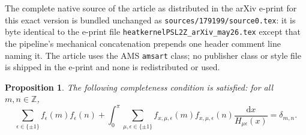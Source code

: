 \documentclass[10pt,a4paper]{amsart}
\newtheorem{proposition}{Proposition}
\newcommand{\Z}{\mathbb{Z}}
\begin{document}
The complete native source of the article as distributed in the arXiv e-print for this exact version is bundled unchanged as \texttt{sources/179199/source0.tex}: it is byte identical to the e-print file \texttt{heatkernelPSL2Z\_arXiv\_may26.tex} except that the pipeline's mechanical concatenation prepends one header comment line naming it. The article uses the AMS \texttt{amsart} class; no publisher class or style file is shipped in the e-print and none is redistributed or used.
\begin{proposition}\label{completeness1}  
The following completeness condition is satisfied: for all $m,n\in\Z$,
$$
\sum_{\epsilon\in\{\pm1\}}f_\epsilon(m)f_\epsilon(n)+\int_0^\pi \sum_{\mu,\epsilon\in\{\pm1\}}f_{x,\mu,\epsilon}(m)f_{x,\mu,\epsilon}(n)\frac{\mathrm{d}x}{H_{\mu\epsilon}(x)}=\delta_{m,n}.
$$
\end{proposition}
\end{document}
